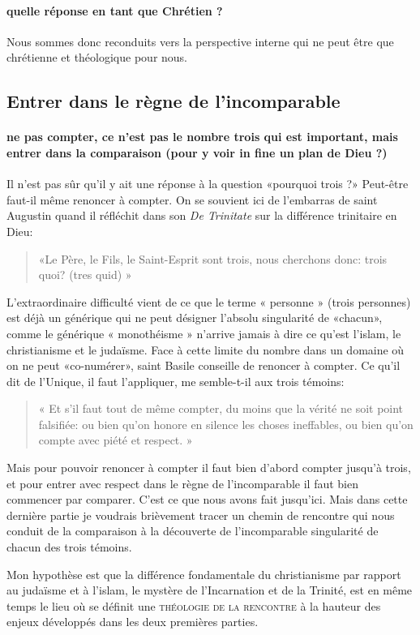 \paragraph{quelle réponse en tant que Chrétien ?}Nous sommes donc reconduits vers la perspective interne qui ne peut être que chrétienne et théologique pour nous.

\subsection{Entrer dans le règne de l'incomparable}

\paragraph{ne pas compter, ce n'est pas le nombre trois qui est important, mais entrer dans la comparaison (pour y voir in fine un plan de Dieu ?)} Il n'est pas sûr qu'il y ait une réponse à la question «pourquoi trois ?» Peut-être faut-il même renoncer à compter.
On se souvient ici de l'embarras de saint Augustin quand il réfléchit dans son \textit{De Trinitate }sur la différence trinitaire en Dieu: \begin{quote}
    «Le Père, le Fils, le Saint-Esprit sont trois, nous cherchons donc: trois quoi? (tres quid) »
\end{quote}
L'extraordinaire difficulté vient de ce que le terme « personne » (trois personnes) est déjà un générique qui ne peut désigner l'absolu singularité de «chacun», comme le générique « monothéisme » n'arrive jamais à dire ce qu'est l'islam, le christianisme et le judaïsme.
Face à cette limite du nombre dans un domaine où on ne peut «co-numérer», saint Basile conseille de renoncer à compter.
Ce qu'il dit de l'Unique, il faut l'appliquer, me semble-t-il aux trois témoins: \begin{quote}
    « Et s'il faut tout de même compter, du moins que la vérité ne soit point falsifiée: ou bien qu'on honore en silence les choses ineffables, ou bien qu'on compte avec piété et respect. »
\end{quote}  Mais pour pouvoir renoncer à compter il faut bien d'abord compter jusqu'à trois, et pour entrer avec respect dans le règne de l'incomparable il faut bien commencer par comparer. C'est ce que nous avons fait jusqu'ici. Mais dans cette dernière partie je voudrais brièvement tracer un chemin de rencontre qui nous conduit de la comparaison à la découverte de l'incomparable singularité de chacun des trois témoins. 
\begin{Synthesis}
Mon hypothèse est que la différence fondamentale du christianisme par rapport au judaïsme et à l'islam, le mystère de l'Incarnation et de la Trinité, est en même temps le lieu  
où se définit une\textsc{ théologie de la rencontre} à la hauteur des enjeux développés dans les deux premières parties. 
\end{Synthesis}

